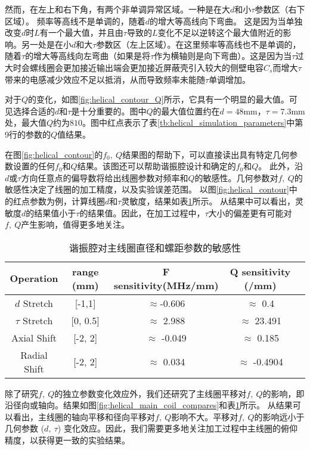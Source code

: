 然而，在左上和右下角，有两个非单调异常区域。一种是在大$d$和小$\tau$参数区（右下区域）。
频率等高线不是单调的，随着$d$的增大等高线向下弯曲。
这是因为当单独改变$d$时$L$有一个最大值，并且由$\tau$导致的$L$变化不足以逆转这个最大值附近的影响。另一处是在小$d$和大$\tau$参数区（左上区域）。在这里频率等高线也不是单调的，随着$\tau$的增大等高线向左弯曲（如果是将$\tau$作为横轴则是向下弯曲）。这是因为当$\tau$过大时会螺线圈会更加接近输出端会更加接近屏蔽壳引入较大的侧壁电容$C_s$而增大$\tau$带来的电感减少效应不足以抵消，从而导致频率未能随$\tau$单调增加。

对于$Q$的变化，如图\ref{fig:helical_contour_Q}所示，它具有一个明显的最大值。可见选择合适的$d$和$\tau$是十分重要的。图中$Q$的最大值位置约在$d=48$mm，$\tau=7.3$mm处，最大值$Q$约为$810$。图中红点表示了表\ref{tb:helical_simulation_parameters}中第9行的参数的$Q$值结果。

在图\ref{fig:helical_contour}的$ f_0,\ Q $结果图的帮助下，可以直接读出具有特定几何参数设置的任何$f_0$和$Q$结果。该图还可以帮助谐振腔设计和确定的$f_0$和$Q$。
此外，沿$d$或$\tau$方向任意点的偏导数将给出线圈参数对频率和$Q$的敏感性。几何参数对$f,\ Q$的敏感性决定了线圈的加工精度，以及实验误差范围。
以图\ref{fig:helical_contour}中的红点参数为例，计算线圈$d$和$\tau$灵敏度，结果如表\ref{tb:helical_d_tau_sensitivity}所示。
从结果中可以看出，灵敏度$d$的结果值小于$\tau$的结果值。因此，在加工过程中，$\tau$大小的偏差更有可能对 $f,\ Q$产生影响，值得更多地关注。

\begin{table}
    \centering
    \caption[谐振腔对主线圈直径和螺距参数的敏感性]{谐振腔对主线圈直径和螺距参数的敏感性\label{tb:helical_d_tau_sensitivity}}
    \begin{tabular}{ccccc}
        \toprule
        Operation & range (mm) & F sensitivity(MHz/mm) & Q sensitivity (/mm) \\
        \midrule
        $d$ Stretch & [-1,1] & $\approx$-0.606 & $\approx$ 0.4\\
        $\tau$ Stretch & [0, 0.5] & $\approx$ 2.988 & $\approx$ 23.491 \\
        Axial Shift & [-2, 2] & $\approx$ -0.049 & $\approx$ 0.185\\
        Radial Shift & [-2, 2] & $\approx$ 0.034 & $\approx$ -0.4904\\
        \bottomrule
    \end{tabular}
\end{table}

除了研究$f,\ Q$的独立参数变化效应外，我们还研究了主线圈平移对$f,\ Q$的影响，即沿径向或轴向。结果如图\ref{fig:helical_main_coil_compares}和表\ref{tb:helical_d_tau_sensitivity}所示。
从结果可以看出，主线圈的轴向平移和径向平移对$f,\ Q$影响不大。平移对$f,\ Q$的影响远小于几何参数 ($d,\ \tau$) 变化效应。因此，我们需要更多地关注加工过程中主线圈的俯仰精度，以获得更一致的实验结果。

